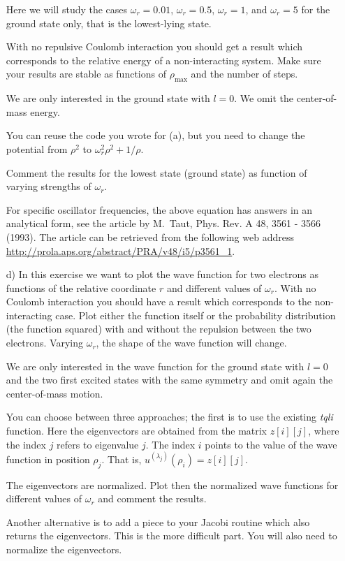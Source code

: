 \documentclass[11pt,a4wide]{article}
\begin{document}
\begin{enumerate}
Here we will study the cases $\omega_r = 0.01$, $\omega_r = 0.5$, $\omega_r =1$,
and $\omega_r = 5$   
for the ground state only, that is the lowest-lying state.


With no repulsive Coulomb interaction 
you should get a result which corresponds to 
the relative energy of a non-interacting system.   
Make sure your results are 
stable as functions of $\rho_{\mathrm{max}}$ and the number of steps.

We are only interested in the ground state with $l=0$. We omit the 
center-of-mass energy.

You can reuse the code you wrote for (a), 
but you need to change the potential
from $\rho^2$ to $\omega_r^2\rho^2+1/\rho$. 

Comment the results for the lowest state (ground state) as function of
varying strengths of $\omega_r$. 


For specific oscillator frequencies, the above equation has answers in an analytical form,
see the article by M.~Taut, Phys. Rev. A 48, 3561 - 3566 (1993).
The article can be retrieved from the following web address
\url{http://prola.aps.org/abstract/PRA/v48/i5/p3561_1}.



\item[d)] 
In this exercise we want to plot the wave function 
for two electrons as functions of the relative coordinate $r$ and different
values of $\omega_r$.  With no Coulomb interaction you should have a result which corresponds to the non-interacting case. 
Plot either the function itself or the probability distribution (the function squared) with and without the repulsion between the two electrons.
Varying $\omega_r$, the shape of the wave function
will change.  

We are only interested in the wave function for the ground state with $l=0$ and the two first excited states with the same symmetry and
omit again the  center-of-mass motion.

You can choose between three approaches; the first is to use the existing
{\em tqli} function. Here the eigenvectors are obtained from the matrix
$z[i][j]$, where the index $j$ refers to eigenvalue $j$. The index $i$
points to the value of the wave function in position $\rho_j$.  
That is,  $u^{(\lambda_j)}(\rho_i)=z[i][j]$.   

The eigenvectors are normalized. 
Plot then the normalized wave functions for different 
values of $\omega_r$ and comment the results.

Another alternative is to add a piece to your Jacobi routine which also
returns the eigenvectors. This is the more difficult part.
You will also need to normalize the eigenvectors.


\end{enumerate}
\end{document}
